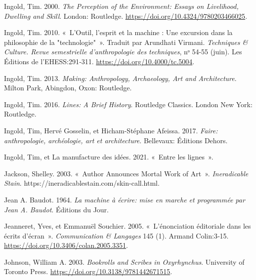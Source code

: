 \begin{CSLReferences}{1}{0}
\leavevmode{}%
Ingold, Tim. 2000. \emph{The {Perception} of the {Environment}: {Essays}
on {Livelihood}, {Dwelling} and {Skill}}. {London}: {Routledge}.
\url{https://doi.org/10.4324/9780203466025}.

\leavevmode{}%
Ingold, Tim. 2010. {«~{L'Outil, l'esprit et la machine : Une excursion
dans la philosophie de la "technologie"}~»}. Traduit par Arundhati
Virmani. \emph{Techniques \& Culture. Revue semestrielle d'anthropologie
des techniques}, nᵒ 54-55 (juin). {Les {É}ditions de l'EHESS}:291‑311.
\url{https://doi.org/10.4000/tc.5004}.

\leavevmode{}%
Ingold, Tim. 2013. \emph{Making: {Anthropology}, {Archaeology}, {Art}
and {Architecture}}. {Milton Park, Abingdon, Oxon}: {Routledge}.

\leavevmode{}%
Ingold, Tim. 2016. \emph{Lines: {A Brief History}}. Routledge
{Classics}. {London New York}: {Routledge}.

\leavevmode{}%
Ingold, Tim, Hervé Gosselin, et Hicham-Stéphane Afeissa. 2017.
\emph{{Faire: anthropologie, arch{é}ologie, art et architecture}}.
{Bellevaux}: {{É}ditions Dehors}.

\leavevmode{}%
Ingold, Tim, et La manufacture des idées. 2021. {«~{Entre les
lignes}~»}.

\leavevmode{}%
Jackson, Shelley. 2003. {«~Author {Announces Mortal Work} of {Art}~»}.
\emph{Ineradicable Stain}. https://ineradicablestain.com/skin-call.html.

\leavevmode{}%
Jean A. Baudot. 1964. \emph{{La machine {à} {é}crire: mise en marche et
programm{é}e par Jean A. Baudot}}. {{É}ditions du Jour}.

\leavevmode{}%
Jeanneret, Yves, et Emmanuël Souchier. 2005. {«~{L'{é}nonciation
{é}ditoriale dans les {é}crits d'{é}cran}~»}. \emph{Communication \&
Langages} 145 (1). {Armand Colin}:3‑15.
\url{https://doi.org/10.3406/colan.2005.3351}.

\leavevmode{}%
Johnson, William A. 2003. \emph{Bookrolls and {Scribes} in
{Oxyrhynchus}}. {University of Toronto Press}.
\url{https://doi.org/10.3138/9781442671515}.


\end{CSLReferences}
